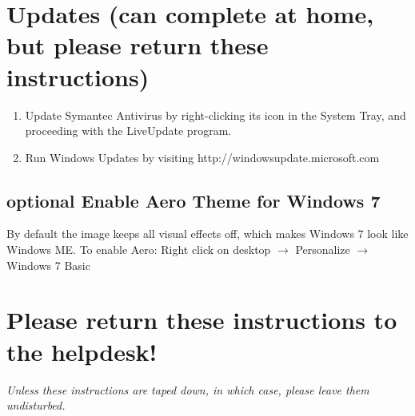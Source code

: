\documentclass[10pt]{article}
\begin{document}
\section{Updates (can complete at home, but please return these instructions)}
\begin{enumerate}
\item Update Symantec Antivirus by right-clicking its icon in the System Tray, and proceeding with the LiveUpdate program.
\item Run Windows Updates by visiting http://windowsupdate.microsoft.com
\end{enumerate}
\subsection{{\sc optional} Enable Aero Theme for Windows 7}
By default the image keeps all visual effects off, which makes Windows 7 look like Windows ME. To enable Aero:
Right click on desktop $\rightarrow$ Personalize $\rightarrow$ Windows 7 Basic
\section{Please return these instructions to the helpdesk!}
\emph{Unless these instructions are taped down, in which case, please leave them undisturbed.}
\end{document}
